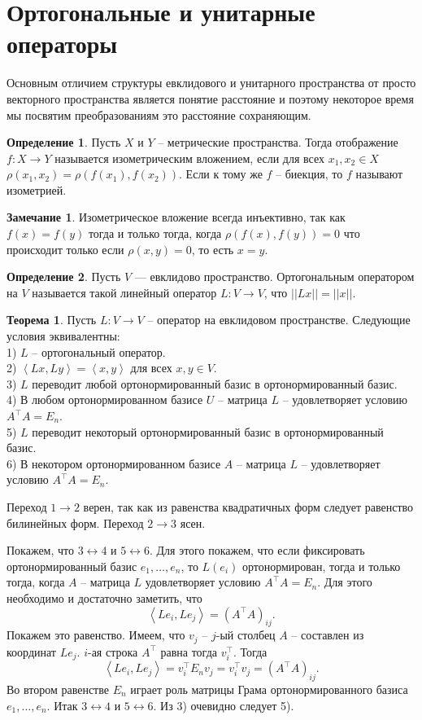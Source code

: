 \documentclass[10pt,a4paper,oneside]{book}
\theoremstyle{definition}
\newtheorem*{rem}{Замечание}
\newtheorem*{defn}{Определение}
\newtheorem{thm}{Теорема}
\def\lan{\left\langle }
\def\ran{\right\rangle}
\def\thrm{\begin{thm}}
\def\ethrm{\end{thm}}
\def\dfn{\begin{defn}}
\def\edfn{\end{defn}}
\def\rm{\begin{rem}}
\def\erm{\end{rem}}
\begin{document}
\section{Ортогональные и унитарные операторы}

Основным отличием структуры евклидового и унитарного пространства от просто векторного пространства является понятие расстояние и поэтому некоторое время мы посвятим преобразованиям это расстояние сохраняющим.

\dfn Пусть $X$ и $Y$ -- метрические пространства. Тогда отображение $f\colon X \to Y$ называется изометрическим вложением, если для всех $x_1,x_2 \in X$ $\rho(x_1,x_2)=\rho(f(x_1),f(x_2))$. Если к тому же $f$ -- биекция, то $f$ называют изометрией.
\edfn

\rm Изометрическое вложение всегда инъективно, так как $f(x)=f(y)$ тогда и только тогда, когда $\rho(f(x),f(y))=0$ что происходит только если $\rho(x,y)=0$, то есть $x=y$.
\erm


\dfn Пусть $V$ --- евклидово пространство. Ортогональным оператором на $V$ называется такой линейный оператор $L \colon V \to V$, что $||Lx||=
||x||$.
\edfn

\thrm Пусть $L\colon V \to V$ -- оператор на евклидовом пространстве. Следующие условия эквивалентны:\\
1) $L$ -- ортогональный оператор.\\
2) $\lan Lx,Ly\ran=\lan x,y \ran$ для всех $x,y \in V$.\\
3) $L$ переводит любой ортонормированный базис в ортонормированный базис.\\
4) В любом ортонормированном базисе $U$ -- матрица $L$ -- удовлетворяет условию $A^{\top} A = E_n$.\\
5) $L$ переводит некоторый ортонормированный базис в ортонормированный базис.\\
6) В некотором ортонормированном базисе $A$ -- матрица $L$ --  удовлетворяет условию $A^{\top} A = E_n$.
\ethrm
\proof
Переход $1\to 2$ верен, так как из равенства квадратичных форм следует равенство билинейных форм. Переход $2\to 3$ ясен.


Покажем, что $3 \leftrightarrow 4$ и $5 \leftrightarrow 6$. Для этого покажем, что если фиксировать ортонормированный базис $e_1,\dots, e_n$, то $L(e_i)$ ортонормирован, тогда и только тогда, когда $A$ -- матрица $L$ удовлетворяет условию $A^{\top}A=E_n$. Для этого необходимо и достаточно заметить, что $$\lan Le_i, Le_j \ran = (A^{\top}A)_{ij}.$$
Покажем это равенство. Имеем, что $v_j$ -- $j$-ый столбец $A$ -- составлен из координат $Le_j$. $i$-ая строка $A^{\top}$ равна тогда $v_i^{\top}$. Тогда $$\lan Le_i,Le_j\ran = v_i^{\top}E_n v_j= v_i^{\top}v_j= (A^{\top}A)_{ij}.$$
Во втором равенстве $E_n$ играет роль матрицы Грама ортонормированного базиса $e_1,\dots, e_n$.
Итак $3 \leftrightarrow 4$ и $5 \leftrightarrow 6$. Из 3) очевидно следует 5).
\end{document}
